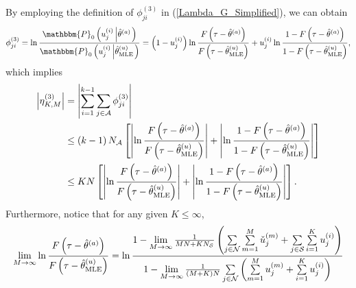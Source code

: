 \documentclass[11pt, draftclsnofoot, onecolumn]{IEEEtran}
\newcommand{\bbP}{\mathbbm{P}}
\newcommand{\cu}{{\check{u}}}
\begin{document}
\begin{IEEEproof}
By employing the definition of ${\phi _{ji}^{\left( 3 \right)}}$ in (\ref{Lambda_G_Simplified}), we can obtain
\begin{equation}
\phi _{ji}^{\left( 3 \right)} = \ln \frac{{{\bbP_0}\left( {u_j^{(i)}\left| {{{\hat \theta }^{(a)}}} \right.} \right)}}{{{\bbP_0}\left( {u_j^{(i)}\left| {\hat \theta _{{\rm{MLE}}}^{(u)}} \right.} \right)}} = \left( {1 - u_j^{(i)}} \right)\ln \frac{{F\left( {\tau  - {{\hat \theta }^{\left( a \right)}}} \right)}}{{F\left( {\tau  - \hat \theta _{{\rm{MLE}}}^{(u)}} \right)}} + u_j^{(i)}\ln \frac{{1 - F\left( {\tau  - {{\hat \theta }^{\left( a \right)}}} \right)}}{{1 - F\left( {\tau  - \hat \theta _{{\rm{MLE}}}^{(u)}} \right)}},
\end{equation}
which implies
\begin{align} \notag
\left| {\eta _{K,M}^{(3)}} \right| & = \left| {\sum\limits_{i = 1}^{k - 1} {\sum\limits_{j \in {\cal A}} {\phi _{ji}^{\left( 3 \right)}} } } \right| \\ \notag
& \le \left( {k - 1} \right){N_{\cal A}}\left[ {\left| {\ln \frac{{F\left( {\tau  - {{\hat \theta }^{\left( a \right)}}} \right)}}{{F\left( {\tau  - \hat \theta _{{\rm{MLE}}}^{(u)}} \right)}}} \right| + \left| {\ln \frac{{1 - F\left( {\tau  - {{\hat \theta }^{\left( a \right)}}} \right)}}{{1 - F\left( {\tau  - \hat \theta _{{\rm{MLE}}}^{(u)}} \right)}}} \right|} \right]\\ \label{eta_3_ub}
& \le KN\left[ {\left| {\ln \frac{{F\left( {\tau  - {{\hat \theta }^{\left( a \right)}}} \right)}}{{F\left( {\tau  - \hat \theta _{{\rm{MLE}}}^{(u)}} \right)}}} \right| + \left| {\ln \frac{{1 - F\left( {\tau  - {{\hat \theta }^{\left( a \right)}}} \right)}}{{1 - F\left( {\tau  - \hat \theta _{{\rm{MLE}}}^{(u)}} \right)}}} \right|} \right].
\end{align}
Furthermore, notice that for any given $K \le \infty$, 
\begin{align} \notag
\mathop {\lim }\limits_{M \to \infty } \ln \frac{{F\left( {\tau  - {{\hat \theta }^{\left( a \right)}}} \right)}}{{F\left( {\tau  - \hat \theta _{{\rm{MLE}}}^{(u)}} \right)}} & = \ln \frac{{1 - \mathop {\lim }\limits_{M \to \infty } \frac{1}{{MN + K{N_{\cal S}}}}\left( {\sum\limits_{j \in {\cal N}} {\sum\limits_{m = 1}^M {\cu_j^{(m)}} }  + \sum\limits_{j \in {\cal S}} {\sum\limits_{i = 1}^K {u_j^{(i)}} } } \right)}}{{1 - \mathop {\lim }\limits_{M \to \infty } \frac{1}{{\left( {M + K} \right)N}}\sum\limits_{j \in {\cal N}} {\left( {\sum\limits_{m = 1}^M {u_j^{(m)}}  + \sum\limits_{i = 1}^K {u_j^{(i)}} } \right)} }}\\ \label{explain_1}

\end{align}
\end{IEEEproof}
\end{document}
